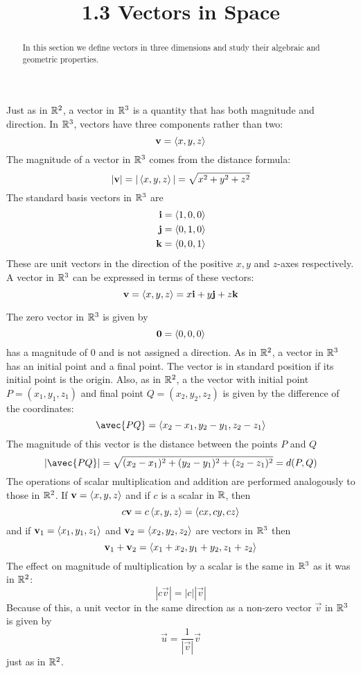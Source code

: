\documentclass[handout]{ximera}
\title{1.3 Vectors in Space}
\begin{document}
\begin{abstract}
In this section we define vectors in three dimensions and study their algebraic and geometric properties.
\end{abstract}
 
\maketitle

Just as in $\mathbb R^2$, a vector in $\mathbb R^3$ is a quantity that has both magnitude and direction.
In $\mathbb R^3$, vectors have three components rather than two:
\[
\mathbf{v} = \left\langle x, y, z\right\rangle
\]
The magnitude of a vector in $\mathbb R^3$ comes from the distance formula:
\[
|\mathbf{v}| = |\left\langle x, y, z\right\rangle| = \sqrt{x^2 + y^2 + z^2}
\]
The standard basis vectors in $\mathbb R^3$ are
\begin{align*}
\mathbf{i} &= \left\langle 1, 0, 0\right\rangle\\
\mathbf{j} &= \left\langle 0, 1, 0\right\rangle\\
\mathbf{k} &= \left\langle 0, 0, 1\right\rangle\\
\end{align*}
These are unit vectors in the direction of the positive $x, y$ and $z$-axes respectively.
A vector in $\mathbb R^3$ can be expressed in terms of these vectors:
\[
\mathbf{v} = \left\langle x, y, z\right\rangle = x\mathbf{i} + y\mathbf{j} + z\mathbf{k}
\]

The zero vector in $\mathbb R^3$ is given by
\[
\mathbf{0} = \left\langle 0,0,0\right\rangle
\]
has a magnitude of $0$ and is not assigned a direction.
As in $\mathbb R^2$, a vector in $\mathbb R^3$ has an initial point and a final point.  The vector is in standard position if its initial point is the origin.
Also, as in $\mathbb R^2$, a the vector with initial point $P = (x_1, y_1, z_1)$ and final point $Q = (x_2, y_2, z_2)$ is given by the difference of the coordinates:
\[
\avec{PQ} = \vector{x_2 - x_1, y_2-y_1, z_2-z_1}
\]
The magnitude of this vector is the distance between the points $P$ and $Q$
\[
|\avec{PQ}| = \sqrt{(x_2-x_1)^2 + (y_2-y_1)^2 +(z_2-z_1)^2} = d(P, Q)
\]
The operations of scalar multiplication and addition are performed analogously to those in $\mathbb R^2$.
If $\mathbf{v} = \left\langle x, y, z\right\rangle$ and if $c$ is a scalar in $\mathbb R$, then
\[
c\mathbf{v} = c\left\langle x, y, z\right\rangle = \left\langle cx, cy, cz\right\rangle
\]
and if $\mathbf{v}_1 = \left\langle x_1, y_1, z_1\right\rangle$ and $\mathbf{v}_2 = \left\langle x_2, y_2, z_2\right\rangle$ are vectors in $\mathbb R^3$ then
\[
\mathbf{v}_1 + \mathbf{v}_2 = \left\langle x_1+x_2, y_1+y_2, z_1+z_2\right\rangle
\]
The effect on magnitude of multiplication by a scalar is the same in $\mathbb R^3$ as it was in $\mathbb R^2$:
\[
|c\vec{v}| = |c| |\vec{v}|
\]
Because of this, a unit vector in the same direction as a non-zero vector $\vec{v}$ in $\mathbb R^3$ is given by
\[
\vec{u} = \frac{1}{|\vec{v}|} \vec{v}
\]
just as in $\mathbb R^2$.
\end{document}
